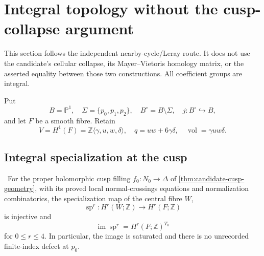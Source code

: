 \section{Integral topology without the cusp-collapse argument}
\label{sec:integral-leray}

This section follows the independent nearby-cycle/Leray route.  It does not
use the candidate's cellular collapse, its Mayer--Vietoris homology matrix,
or the asserted equality between those two constructions.  All coefficient
groups are integral.

Put
\[
 B=\mathbb P^1,\quad \Sigma=\{p_0,p_1,p_2\},\quad
 B^\circ=B\setminus\Sigma,\quad j:B^\circ\hookrightarrow B,
\]
and let \(F\) be a smooth fibre.  Retain
\[
 V=H^1(F)=\mathbb Z\langle\gamma,u,w,\delta\rangle,
 \quad q=uw+6\gamma\delta,
 \quad \operatorname{vol}=\gamma uw\delta.
\]

\subsection{Integral specialization at the cusp}

\begin{theorem}
\label{thm:p0-integral-specialization}
\Verified\ For the proper holomorphic cusp filling
\(f_0:N_0\to\Delta\) of \cref{thm:candidate-cusp-geometry}, with its
proved local normal-crossings equations and normalization combinatorics,
the specialization map of the central fibre \(W\),
\[
 \operatorname{sp}^r:H^r(W;\mathbb Z)\longrightarrow H^r(F;\mathbb Z)
\]
is injective and
\[
 \operatorname{im}\operatorname{sp}^r
 =H^r(F;\mathbb Z)^{T_0}
\tag{5.1}
\]
for \(0\le r\le4\).  In particular, the image is saturated and there is no
unrecorded finite-index defect at \(p_0\).
\end{theorem}

